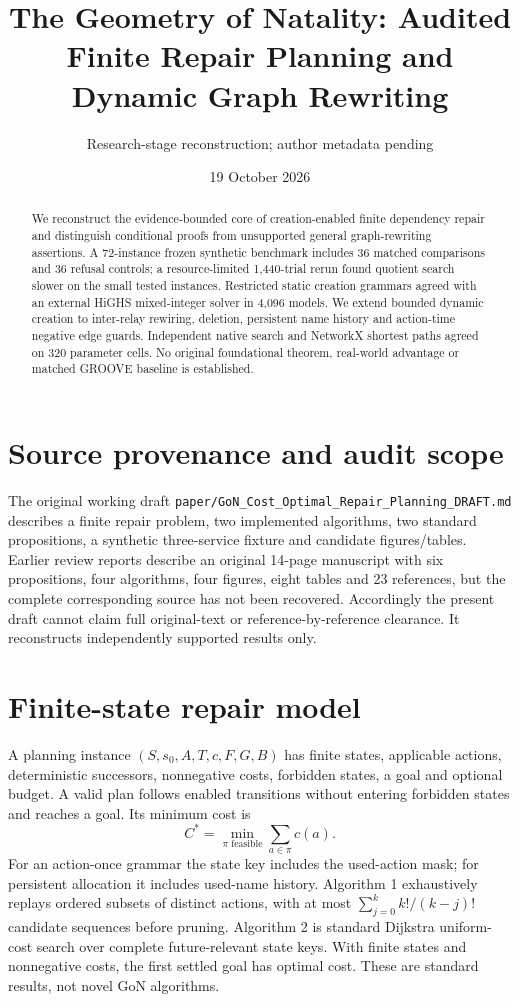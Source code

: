 \documentclass[10pt,a4paper]{article}
\title{The Geometry of Natality: Audited Finite Repair Planning and Dynamic Graph Rewriting}
\author{Research-stage reconstruction; author metadata pending}
\date{19 October 2026}
\begin{document}
\maketitle
\begin{abstract}
We reconstruct the evidence-bounded core of creation-enabled finite dependency repair and distinguish conditional proofs from unsupported general graph-rewriting assertions. A 72-instance frozen synthetic benchmark includes 36 matched comparisons and 36 refusal controls; a resource-limited 1,440-trial rerun found quotient search slower on the small tested instances. Restricted static creation grammars agreed with an external HiGHS mixed-integer solver in 4,096 models. We extend bounded dynamic creation to inter-relay rewiring, deletion, persistent name history and action-time negative edge guards. Independent native search and NetworkX shortest paths agreed on 320 parameter cells. No original foundational theorem, real-world advantage or matched GROOVE baseline is established.
\end{abstract}
\section{Source provenance and audit scope}
The original working draft \texttt{paper/GoN\_Cost\_Optimal\_Repair\_Planning\_DRAFT.md} describes a finite repair problem, two implemented algorithms, two standard propositions, a synthetic three-service fixture and candidate figures/tables. Earlier review reports describe an original 14-page manuscript with six propositions, four algorithms, four figures, eight tables and 23 references, but the complete corresponding source has not been recovered. Accordingly the present draft cannot claim full original-text or reference-by-reference clearance. It reconstructs independently supported results only.
\section{Finite-state repair model}
A planning instance $(S,s_0,A,T,c,F,G,B)$ has finite states, applicable actions, deterministic successors, nonnegative costs, forbidden states, a goal and optional budget. A valid plan follows enabled transitions without entering forbidden states and reaches a goal. Its minimum cost is
\[
 C^*=\min_{\pi\text{ feasible}}\sum_{a\in\pi}c(a).
\]
For an action-once grammar the state key includes the used-action mask; for persistent allocation it includes used-name history. Algorithm 1 exhaustively replays ordered subsets of distinct actions, with at most $\sum_{j=0}^k k!/(k-j)!$ candidate sequences before pruning. Algorithm 2 is standard Dijkstra uniform-cost search over complete future-relevant state keys. With finite states and nonnegative costs, the first settled goal has optimal cost. These are standard results, not novel GoN algorithms.
\end{document}
